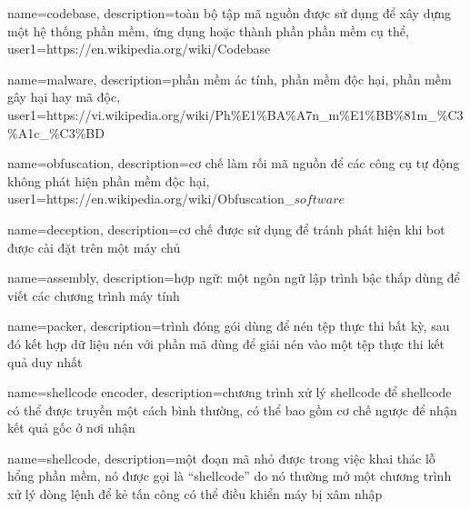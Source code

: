 {
	name={codebase},
	description={toàn bộ tập mã nguồn được sử dụng để xây dựng một hệ thống phần mềm, ứng dụng hoặc thành phần phần mềm cụ thể},
	user1={https://en.wikipedia.org/wiki/Codebase}
}

{
	name={malware},
	description={phần mềm ác tính, phần mềm độc hại, phần mềm gây hại hay mã độc},
	user1={https://vi.wikipedia.org/wiki/Ph\%E1\%BA\%A7n_m\%E1\%BB\%81m_\%C3\%A1c_\%C3\%BD}
}

{
	name={obfuscation},
	description={cơ chế làm rối mã nguồn để các công cụ tự động không phát hiện phần mềm độc hại},
	user1={https://en.wikipedia.org/wiki/Obfuscation_\(software\)}
}

{
	name={deception},
	description={cơ chế được sử dụng để tránh phát hiện khi bot được cài đặt trên một máy chủ}
}

{
	name={assembly},
	description={hợp ngữ: một ngôn ngữ lập trình bậc thấp dùng để viết các chương trình máy tính}
}

{
	name={packer},
	description={trình đóng gói dùng để nén tệp thực thi bất kỳ, sau đó kết hợp dữ liệu nén với phần mã dùng để giải nén vào một tệp thực thi kết quả duy nhất}
}

{
	name={shellcode encoder},
	description={chương trình xử lý shellcode để shellcode có thể được truyền một cách bình thường, có thể bao gồm cơ chế ngược để nhận kết quả gốc ở nơi nhận}
}

{
	name={shellcode},
	description={một đoạn mã nhỏ được trong việc khai thác lỗ hổng phần mềm, nó được gọi là ``shellcode'' do nó thường mở một chương trình xử lý dòng lệnh để kẻ tấn công có thể điều khiển máy bị xâm nhập}
}

